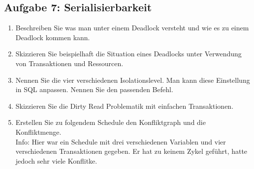 \subsection{Aufgabe 7: Serialisierbarkeit}
\label{sec:Aufgabe7}
\begin{enumerate}[label=\alph*)]
    \item Beschreiben Sie was man unter einem Deadlock versteht und wie es zu
        einem Deadlock kommen kann.
    \item Skizzieren Sie beispielhaft die Situation eines Deadlocks unter
        Verwendung von Transaktionen und Ressourcen.
    \item Nennen Sie die vier verschiedenen Isolationslevel. Man kann diese
        Einstellung in SQL anpassen. Nennen Sie den passenden Befehl.
    \item Skizzieren Sie die Dirty Read Problematik mit einfachen Transaktionen.
    \item Erstellen Sie zu folgendem Schedule den Konfliktgraph und die Konfliktmenge.\\
          Info: Hier war ein Schedule mit drei verschiedenen Variablen und vier
          verschiedenen Transaktionen gegeben. Er hat zu keinem Zykel geführt,
          hatte jedoch sehr viele Konflitke.
\end{enumerate}
